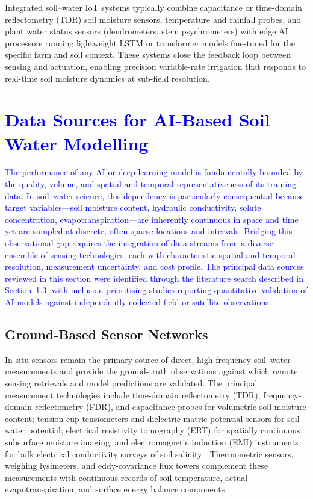\documentclass[land,article,submit,pdftex,moreauthors]{Definitions/mdpi}
\numberwithin{equation}{section}
\begin{document}
Integrated soil--water IoT systems typically combine capacitance or time-domain reflectometry (TDR) soil moisture sensors, temperature and rainfall probes, and plant water status sensors (dendrometers, stem psychrometers) with edge AI processors running lightweight LSTM or transformer models fine-tuned for the specific farm and soil context. These systems close the feedback loop between sensing and actuation, enabling precision variable-rate irrigation that responds to real-time soil moisture dynamics at sub-field resolution.


\section{\textcolor{blue}{Data Sources for AI-Based Soil--Water Modelling}}

\textcolor{blue}{The performance of any AI or deep learning model is fundamentally bounded by the quality, volume, and spatial and temporal representativeness of its training data. In soil--water science, this dependency is particularly consequential because target variables---soil moisture content, hydraulic conductivity, solute concentration, evapotranspiration---are inherently continuous in space and time yet are sampled at discrete, often sparse locations and intervals. Bridging this observational gap requires the integration of data streams from a diverse ensemble of sensing technologies, each with characteristic spatial and temporal resolution, measurement uncertainty, and cost profile. The principal data sources reviewed in this section were identified through the literature search described in Section~1.3, with inclusion prioritising studies reporting quantitative validation of AI models against independently collected field or satellite observations.}

\subsection{Ground-Based Sensor Networks}

In situ sensors remain the primary source of direct, high-frequency soil--water measurements and provide the ground-truth observations against which remote sensing retrievals and model predictions are validated. The principal measurement technologies include time-domain reflectometry (TDR), frequency-domain reflectometry (FDR), and capacitance probes for volumetric soil moisture content; tension-cup tensiometers and dielectric matric potential sensors for soil water potential; electrical resistivity tomography (ERT) for spatially continuous subsurface moisture imaging; and electromagnetic induction (EMI) instruments for bulk electrical conductivity surveys of soil salinity \citep{vereecken2014soil}. Thermometric sensors, weighing lysimeters, and eddy-covariance flux towers complement these measurements with continuous records of soil temperature, actual evapotranspiration, and surface energy balance components.
\end{document}
